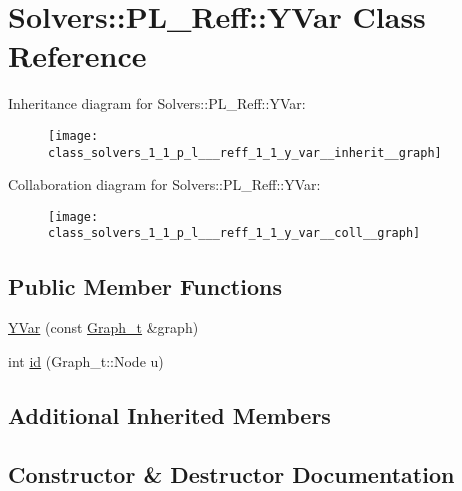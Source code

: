 \hypertarget{class_solvers_1_1_p_l___reff_1_1_y_var}{}\section{Solvers\+:\+:P\+L\+\_\+\+Reff\+:\+:Y\+Var Class Reference}
\label{class_solvers_1_1_p_l___reff_1_1_y_var}


Inheritance diagram for Solvers\+:\+:P\+L\+\_\+\+Reff\+:\+:Y\+Var\+:\nopagebreak
\begin{figure}[H]
\begin{center}
\leavevmode
\texttt{[image: class\_solvers\_1\_1\_p\_l\_\_\_reff\_1\_1\_y\_var\_\_inherit\_\_graph]}
\end{center}
\end{figure}


Collaboration diagram for Solvers\+:\+:P\+L\+\_\+\+Reff\+:\+:Y\+Var\+:\nopagebreak
\begin{figure}[H]
\begin{center}
\leavevmode
\texttt{[image: class\_solvers\_1\_1\_p\_l\_\_\_reff\_1\_1\_y\_var\_\_coll\_\_graph]}
\end{center}
\end{figure}
\subsection*{Public Member Functions}
\begin{DoxyCompactItemize}
\item 
\hyperlink{class_solvers_1_1_p_l___reff_1_1_y_var_a62c7b77c738d72957f3770b1f30ba0bf}{Y\+Var} (const \hyperlink{pl__reff_8cpp_a65aea14f39d53b24df9910d54216d620}{Graph\+\_\+t} \&graph)
\item 
int \hyperlink{class_solvers_1_1_p_l___reff_1_1_y_var_a96b14b9e99eb3440f2a754449154e37c}{id} (Graph\+\_\+t\+::\+Node u)
\end{DoxyCompactItemize}
\subsection*{Additional Inherited Members}


\subsection{Constructor \& Destructor Documentation}
\mbox{\label{class_solvers_1_1_p_l___reff_1_1_y_var_a62c7b77c738d72957f3770b1f30ba0bf}} 
